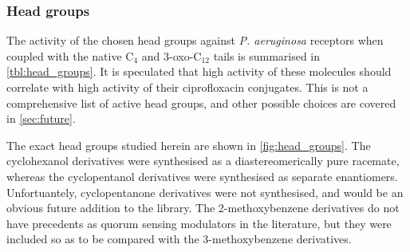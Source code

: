 \subsubsection{Head groups}

The activity of the chosen head groups against \textit{P. aeruginosa} receptors when coupled with the native C$_4$ and 3-oxo-C$_12$ tails is summarised in \ref{tbl:head_groups}. It is speculated that high activity of these molecules should correlate with high activity of their ciprofloxacin conjugates.
This is not a comprehensive list of active head groups, and other possible choices are covered in \ref{sec:future}.

The exact head groups studied herein are shown in \ref{fig:head_groups}. The cyclohexanol derivatives were synthesised as a diastereomerically pure racemate, whereas the cyclopentanol derivatives were synthesised as separate enantiomers. Unfortuantely, cyclopentanone derivatives were not synthesised, and would be an obvious future addition to the library. The 2-methoxybenzene derivatives do not have precedents as quorum sensing modulators in the literature, but they were included so as to be compared with the 3-methoxybenzene derivatives.


